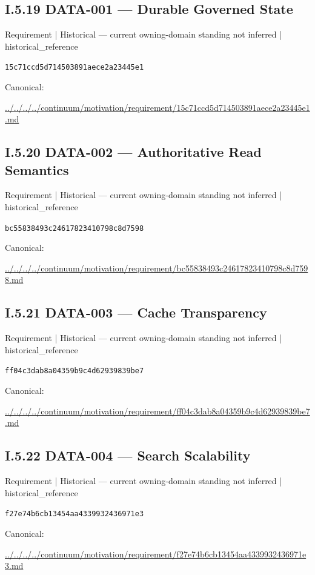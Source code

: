 \documentclass[10pt,a4paper]{article}
\begin{document}
\subsection*{I.5.19 DATA-001 — Durable Governed State}
{\small Requirement | Historical — current owning-domain standing not inferred | historical\_reference}\par
\texttt{15c71ccd5d714503891aece2a23445e1}\par
Canonical: \par
{\footnotesize\url{../../../../continuum/motivation/requirement/15c71ccd5d714503891aece2a23445e1.md}}\par
\subsection*{I.5.20 DATA-002 — Authoritative Read Semantics}
{\small Requirement | Historical — current owning-domain standing not inferred | historical\_reference}\par
\texttt{bc55838493c24617823410798c8d7598}\par
Canonical: \par
{\footnotesize\url{../../../../continuum/motivation/requirement/bc55838493c24617823410798c8d7598.md}}\par
\subsection*{I.5.21 DATA-003 — Cache Transparency}
{\small Requirement | Historical — current owning-domain standing not inferred | historical\_reference}\par
\texttt{ff04c3dab8a04359b9c4d62939839be7}\par
Canonical: \par
{\footnotesize\url{../../../../continuum/motivation/requirement/ff04c3dab8a04359b9c4d62939839be7.md}}\par
\subsection*{I.5.22 DATA-004 — Search Scalability}
{\small Requirement | Historical — current owning-domain standing not inferred | historical\_reference}\par
\texttt{f27e74b6cb13454aa4339932436971e3}\par
Canonical: \par
{\footnotesize\url{../../../../continuum/motivation/requirement/f27e74b6cb13454aa4339932436971e3.md}}\par
\end{document}
